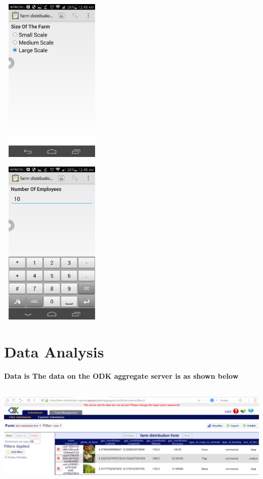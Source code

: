 \documentclass{article}
\begin{document}
\graphicspath{{farm/}}
\includegraphics[width = 5cm , height = 8cm ]{11111}
\graphicspath{{farm/}}
\includegraphics[width = 5cm , height = 8cm ]{111111}


\section{Data Analysis}

{\bfseries Data is The data on the ODK aggregate server is as shown below }\\
\graphicspath{{farm/}}
\includegraphics[width = 15cm , height = 5cm ]{farm}
\end{document}
